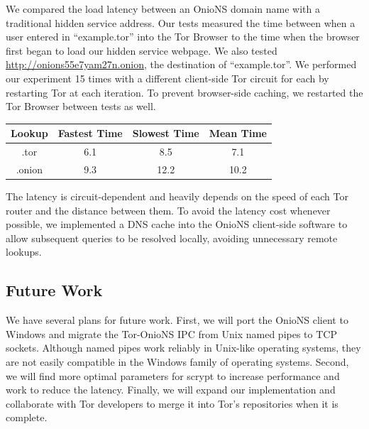 We compared the load latency between an OnioNS domain name with a traditional hidden service address. Our tests measured the time between when a user entered in ``example.tor'' into the Tor Browser to the time when the browser first began to load our hidden service webpage. We also tested \url{http://onions55e7yam27n.onion}, the destination of ``example.tor''. We performed our experiment 15 times with a different client-side Tor circuit for each by restarting Tor at each iteration. To prevent browser-side caching, we restarted the Tor Browser between tests as well. 

\renewcommand{\arraystretch}{1}
\begin{center}
    \begin{tabular}{ | c | c | c | c |}
    \hline
    \textbf{Lookup} & \textbf{Fastest Time} & \textbf{Slowest Time} & \textbf{Mean Time} \\
    \hline
    .tor & 6.1 & 8.5 & 7.1 \\ \hline
	.onion & 9.3 & 12.2 & 10.2 \\
	\hline
    \end{tabular}
\end{center}

The latency is circuit-dependent and heavily depends on the speed of each Tor router and the distance between them. To avoid the latency cost whenever possible, we implemented a DNS cache into the OnioNS client-side software to allow subsequent queries to be resolved locally, avoiding unnecessary remote lookups.

\subsection{Future Work}

We have several plans for future work. First, we will port the OnioNS client to Windows and migrate the Tor-OnioNS IPC from Unix named pipes to TCP sockets. Although named pipes work reliably in Unix-like operating systems, they are not easily compatible in the Windows family of operating systems. Second, we will find more optimal parameters for scrypt to increase performance and work to reduce the latency. Finally, we will expand our implementation and collaborate with Tor developers to merge it into Tor's repositories when it is complete.


%
%
%

